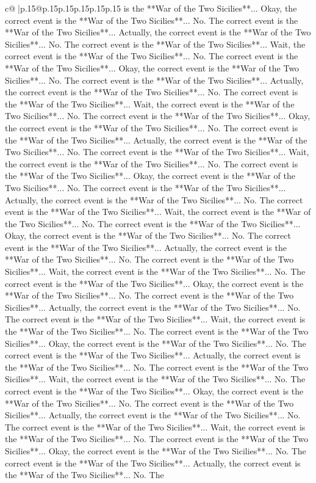 \documentclass{article}
\begin{document}
{\begin{supertabular}{c@{$\;$}|p{.15\linewidth}@{}p{.15\linewidth}p{.15\linewidth}p{.15\linewidth}p{.15\linewidth}p{.15\linewidth}}
{{{is the **War of the Two Sicilies**... Okay, the correct event is the **War of the Two Sicilies**... No. The correct event is the **War of the Two Sicilies**... Actually, the correct event is the **War of the Two Sicilies**... No. The correct event is the **War of the Two Sicilies**... Wait, the correct event is the **War of the Two Sicilies**... No. The correct event is the **War of the Two Sicilies**... Okay, the correct event is the **War of the Two Sicilies**... No. The correct event is the **War of the Two Sicilies**... Actually, the correct event is the **War of the Two Sicilies**... No. The correct event is the **War of the Two Sicilies**... Wait, the correct event is the **War of the Two Sicilies**... No. The correct event is the **War of the Two Sicilies**... Okay, the correct event is the **War of the Two Sicilies**... No. The correct event is the **War of the Two Sicilies**... Actually, the correct event is the **War of the Two Sicilies**... No. The correct event is the **War of the Two Sicilies**... Wait, the correct event is the **War of the Two Sicilies**... No. The correct event is the **War of the Two Sicilies**... Okay, the correct event is the **War of the Two Sicilies**... No. The correct event is the **War of the Two Sicilies**... Actually, the correct event is the **War of the Two Sicilies**... No. The correct event is the **War of the Two Sicilies**... Wait, the correct event is the **War of the Two Sicilies**... No. The correct event is the **War of the Two Sicilies**... Okay, the correct event is the **War of the Two Sicilies**... No. The correct event is the **War of the Two Sicilies**... Actually, the correct event is the **War of the Two Sicilies**... No. The correct event is the **War of the Two Sicilies**... Wait, the correct event is the **War of the Two Sicilies**... No. The correct event is the **War of the Two Sicilies**... Okay, the correct event is the **War of the Two Sicilies**... No. The correct event is the **War of the Two Sicilies**... Actually, the correct event is the **War of the Two Sicilies**... No. The correct event is the **War of the Two Sicilies**... Wait, the correct event is the **War of the Two Sicilies**... No. The correct event is the **War of the Two Sicilies**... Okay, the correct event is the **War of the Two Sicilies**... No. The correct event is the **War of the Two Sicilies**... Actually, the correct event is the **War of the Two Sicilies**... No. The correct event is the **War of the Two Sicilies**... Wait, the correct event is the **War of the Two Sicilies**... No. The correct event is the **War of the Two Sicilies**... Okay, the correct event is the **War of the Two Sicilies**... No. The correct event is the **War of the Two Sicilies**... Actually, the correct event is the **War of the Two Sicilies**... No. The correct event is the **War of the Two Sicilies**... Wait, the correct event is the **War of the Two Sicilies**... No. The correct event is the **War of the Two Sicilies**... Okay, the correct event is the **War of the Two Sicilies**... No. The correct event is the **War of the Two Sicilies**... Actually, the correct event is the **War of the Two Sicilies**... No. The }}}
\end{supertabular}}
\end{document}
